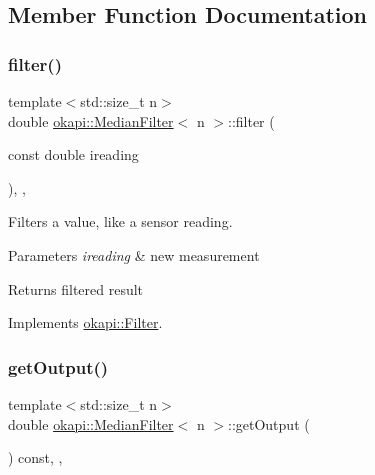 \subsection{Member Function Documentation}
\mbox{\label{classokapi_1_1MedianFilter_a91e4104c4862082cd17ab92b43c02fab}} 
\subsubsection{\texorpdfstring{filter()}{filter()}}
{\footnotesize\ttfamily template$<$std\+::size\+\_\+t n$>$ \\
double \mbox{\hyperlink{classokapi_1_1MedianFilter}{okapi\+::\+Median\+Filter}}$<$ n $>$\+::filter (\begin{DoxyParamCaption}\item[{const double}]{ireading }\end{DoxyParamCaption})\hspace{0.3cm}{\ttfamily [inline]}, {\ttfamily [override]}, {\ttfamily [virtual]}}

Filters a value, like a sensor reading.


\begin{DoxyParams}{Parameters}
{\em ireading} & new measurement \\
\hline
\end{DoxyParams}
\begin{DoxyReturn}{Returns}
filtered result 
\end{DoxyReturn}


Implements \mbox{\hyperlink{classokapi_1_1Filter_a7c2ea0b64b37b688900189856d58da15}{okapi\+::\+Filter}}.

\mbox{\label{classokapi_1_1MedianFilter_ac38e6d04879eaeb98b853a24cb26e28c}} 
\subsubsection{\texorpdfstring{getOutput()}{getOutput()}}
{\footnotesize\ttfamily template$<$std\+::size\+\_\+t n$>$ \\
double \mbox{\hyperlink{classokapi_1_1MedianFilter}{okapi\+::\+Median\+Filter}}$<$ n $>$\+::get\+Output (\begin{DoxyParamCaption}{ }\end{DoxyParamCaption}) const\hspace{0.3cm}{\ttfamily [inline]}, {\ttfamily [override]}, {\ttfamily [virtual]}}

